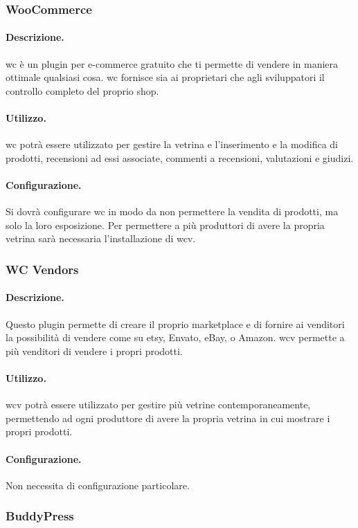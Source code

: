 \subsubsection{WooCommerce}
\paragraph{Descrizione.} \gls{wc} è un plugin per e-commerce gratuito che ti permette di vendere in maniera ottimale qualsiasi cosa. \gls{wc} fornisce sia ai proprietari che agli sviluppatori il controllo completo del proprio shop.
\paragraph{Utilizzo.} \gls{wc} potrà essere utilizzato per gestire la vetrina e l'inserimento e la modifica di prodotti, recensioni ad essi associate, commenti a recensioni, valutazioni e giudizi.
\paragraph{Configurazione.} Si dovrà configurare \gls{wc} in modo da non permettere la vendita di prodotti, ma solo la loro esposizione.
Per permettere a più produttori di avere la propria vetrina sarà necessaria l'installazione di \gls{wcv}.

\subsubsection{WC Vendors}
\paragraph{Descrizione.} Questo plugin permette di creare il proprio marketplace e di fornire ai venditori la possibilità di vendere come su etsy, Envato, eBay, o Amazon. \gls{wcv} permette a più venditori di vendere i propri prodotti.
\paragraph{Utilizzo.} \gls{wcv} potrà essere utilizzato per gestire più vetrine contemporaneamente, permettendo ad ogni produttore di avere la propria vetrina in cui mostrare i propri prodotti.
\paragraph{Configurazione.} Non necessita di configurazione particolare.

\subsubsection{BuddyPress}
